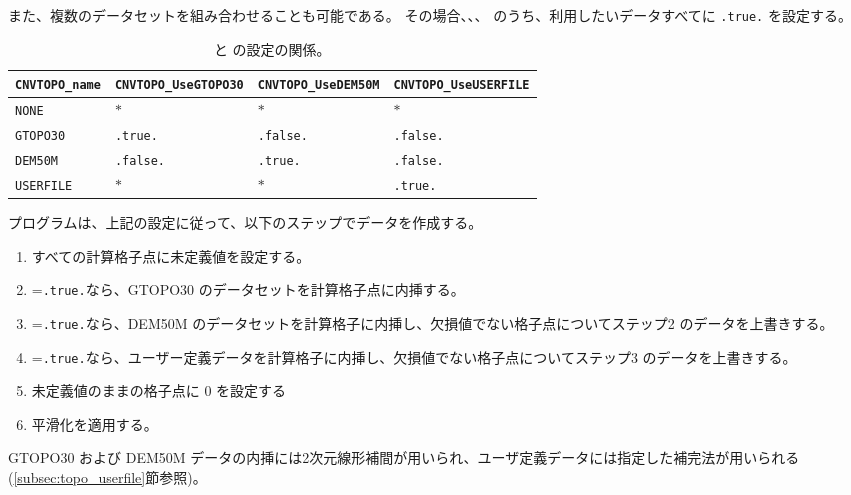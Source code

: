また、複数のデータセットを組み合わせることも可能である。
その場合、、、 のうち、利用したいデータすべてに \verb|.true.| を設定する。

\begin{table}[tbh]
\begin{center}
\caption{ と  の設定の関係。}
\begin{tabularx}{150mm}{l|l|l|l} \hline
  \rowcolor[gray]{0.9} \verb|CNVTOPO_name|   & \verb|CNVTOPO_UseGTOPO30| & \verb|CNVTOPO_UseDEM50M| & \verb|CNVTOPO_UseUSERFILE| \\ \hline
                       \verb|NONE|           & $\ast$         & $\ast$         & $\ast$          \\ \hline
                       \verb|GTOPO30|        & \verb|.true.|  & \verb|.false.| & \verb|.false.|  \\ \hline
                       \verb|DEM50M|         & \verb|.false.| & \verb|.true.|  & \verb|.false.|  \\ \hline
                       \verb|USERFILE|       & $\ast$         & $\ast$         & \verb|.true.|   \\ \hline
\end{tabularx}
\label{tab:cvntopo_name}
\end{center}
\end{table}



プログラムは、上記の設定に従って、以下のステップでデータを作成する。
\begin{enumerate}[1)]
 \item すべての計算格子点に未定義値を設定する。
 \item {}=\verb|.true.|なら、GTOPO30 のデータセットを計算格子点に内挿する。
 \item {}=\verb|.true.|なら、DEM50M のデータセットを計算格子に内挿し、欠損値でない格子点についてステップ2 のデータを上書きする。
 \item {}=\verb|.true.|なら、ユーザー定義データを計算格子に内挿し、欠損値でない格子点についてステップ3 のデータを上書きする。
 \item 未定義値のままの格子点に 0 を設定する
 \item 平滑化を適用する。
\end{enumerate}
GTOPO30 および DEM50M データの内挿には2次元線形補間が用いられ、ユーザ定義データには指定した補完法が用いられる (\ref{subsec:topo_userfile}節参照)。

